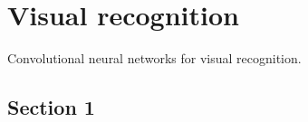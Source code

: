 \chapter{Visual recognition}
Convolutional neural networks for visual recognition.
\section{Section 1}


